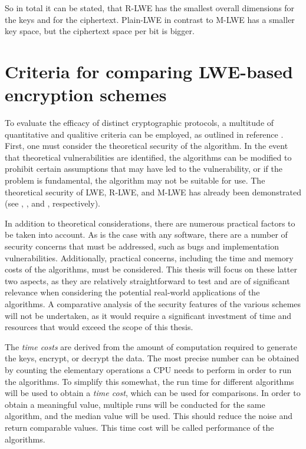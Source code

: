 So in total it can be stated, that R-LWE has the smallest overall dimensions for the keys and for the ciphertext. Plain-LWE in contrast to M-LWE has a smaller key space, but the ciphertext space per bit is bigger.

\section{Criteria for comparing LWE-based encryption schemes}
\label{sec:LweComparisonCriteria}

To evaluate the efficacy of distinct cryptographic protocols, a multitude of quantitative and qualitive criteria can be employed, as outlined in reference \cite{CryptoMetrics}. First, one must consider the theoretical security of the algorithm. In the event that theoretical vulnerabilities are identified, the algorithms can be modified to prohibit certain assumptions that may have led to the vulnerability, or if the problem is fundamental, the algorithm may not be suitable for use. The theoretical security of LWE, R-LWE, and M-LWE has already been demonstrated (see \cite{Regev2005OnLL}, \cite{RLWEproof}, and \cite{MLWEproof}, respectively).

In addition to theoretical considerations, there are numerous practical factors to be taken into account. As is the case with any software, there are a number of security concerns that must be addressed, such as bugs and implementation vulnerabilities. Additionally, practical concerns, including the time and memory costs of the algorithms, must be considered. This thesis will focus on these latter two aspects, as they are relatively straightforward to test and are of significant relevance when considering the potential real-world applications of the algorithms. A comparative analysis of the security features of the various schemes will not be undertaken, as it would require a significant investment of time and resources that would exceed the scope of this thesis.

The \textit{time costs} are derived from the amount of computation required to generate the keys, encrypt, or decrypt the data. The most precise number can be obtained by counting the elementary operations a CPU needs to perform in order to run the algorithms. To simplify this somewhat, the run time for different algorithms will be used to obtain a \textit{time cost}, which can be used for comparisons. In order to obtain a meaningful value, multiple runs will be conducted for the same algorithm, and the median value will be used. This should reduce the noise and return comparable values. This time cost will be called performance of the algorithms.

